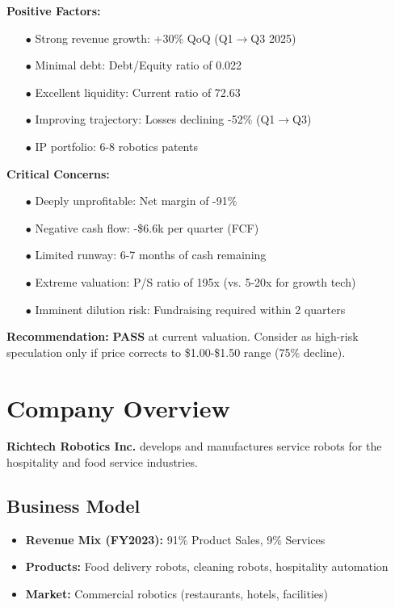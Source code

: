 \documentclass[11pt,a4paper]{article}
\begin{document}
\textbf{Positive Factors:}
\begin{itemize}[leftmargin=*, itemsep=0pt]
    \item[\textcolor{bullish}{$\bullet$}] Strong revenue growth: +30\% QoQ (Q1$\rightarrow$Q3 2025)
    \item[\textcolor{bullish}{$\bullet$}] Minimal debt: Debt/Equity ratio of 0.022
    \item[\textcolor{bullish}{$\bullet$}] Excellent liquidity: Current ratio of 72.63
    \item[\textcolor{bullish}{$\bullet$}] Improving trajectory: Losses declining -52\% (Q1$\rightarrow$Q3)
    \item[\textcolor{bullish}{$\bullet$}] IP portfolio: 6-8 robotics patents
\end{itemize}

\vspace{0.3cm}

\textbf{Critical Concerns:}
\begin{itemize}[leftmargin=*, itemsep=0pt]
    \item[\textcolor{bearish}{$\bullet$}] Deeply unprofitable: Net margin of -91\%
    \item[\textcolor{bearish}{$\bullet$}] Negative cash flow: -\$6.6k per quarter (FCF)
    \item[\textcolor{bearish}{$\bullet$}] Limited runway: 6-7 months of cash remaining
    \item[\textcolor{bearish}{$\bullet$}] Extreme valuation: P/S ratio of 195x (vs. 5-20x for growth tech)
    \item[\textcolor{bearish}{$\bullet$}] Imminent dilution risk: Fundraising required within 2 quarters
\end{itemize}

\vspace{0.3cm}

\textbf{Recommendation:} \textbf{PASS} at current valuation. Consider as high-risk speculation only if price corrects to \$1.00-\$1.50 range (75\% decline).

\newpage

\section{Company Overview}

\textbf{Richtech Robotics Inc.} develops and manufactures service robots for the hospitality and food service industries.

\subsection{Business Model}
\begin{itemize}[itemsep=0pt]
    \item \textbf{Revenue Mix (FY2023):} 91\% Product Sales, 9\% Services
    \item \textbf{Products:} Food delivery robots, cleaning robots, hospitality automation
    \item \textbf{Market:} Commercial robotics (restaurants, hotels, facilities)
\end{itemize}
\end{document}
